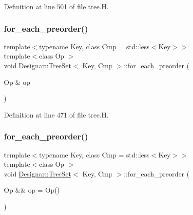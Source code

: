 Definition at line 501 of file tree.\+H.

\mbox{\label{class_designar_1_1_tree_set_ae464b1e41281166a0beda95787f6f303}} 
\subsubsection{\texorpdfstring{for\+\_\+each\+\_\+preorder()}{for\_each\_preorder()}\hspace{0.1cm}{\footnotesize\ttfamily [1/2]}}
{\footnotesize\ttfamily template$<$typename Key, class Cmp = std\+::less$<$\+Key$>$$>$ \\
template$<$class Op $>$ \\
void \hyperlink{class_designar_1_1_tree_set}{Designar\+::\+Tree\+Set}$<$ Key, Cmp $>$\+::for\+\_\+each\+\_\+preorder (\begin{DoxyParamCaption}\item[{Op \&}]{op }\end{DoxyParamCaption})\hspace{0.3cm}{\ttfamily [inline]}}



Definition at line 471 of file tree.\+H.

\mbox{\label{class_designar_1_1_tree_set_a45484640b06b18673646c606cf278e08}} 
\subsubsection{\texorpdfstring{for\+\_\+each\+\_\+preorder()}{for\_each\_preorder()}\hspace{0.1cm}{\footnotesize\ttfamily [2/2]}}
{\footnotesize\ttfamily template$<$typename Key, class Cmp = std\+::less$<$\+Key$>$$>$ \\
template$<$class Op $>$ \\
void \hyperlink{class_designar_1_1_tree_set}{Designar\+::\+Tree\+Set}$<$ Key, Cmp $>$\+::for\+\_\+each\+\_\+preorder (\begin{DoxyParamCaption}\item[{Op \&\&}]{op = {\ttfamily Op()} }\end{DoxyParamCaption})\hspace{0.3cm}{\ttfamily [inline]}}



